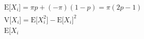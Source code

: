 \documentclass[preview]{standalone}
\begin{document}
\begin{align*}
\mathrm{E}\big[X_{i}\big]=\pi p + (-\pi)(1 - p) =\pi(2p - 1) \\\mathrm{V}\big[X_{i}\big]=\mathrm{E}\big[X_{i}^{2}\big]-\mathrm{E}\big[X_{i}\big]^{2} \\\mathrm{E}\big[X_{i}
\end{align*}
\end{document}
